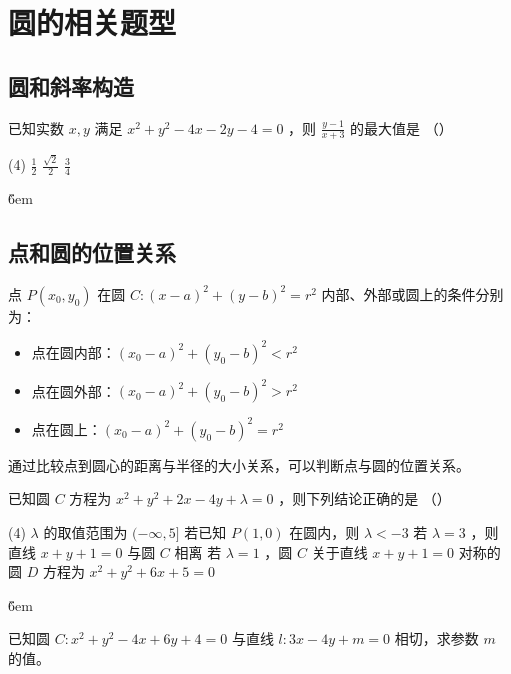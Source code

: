 \section{圆的相关题型}

\subsection{圆和斜率构造}

\begin{example}
    已知实数 $x, y$ 满足 $x^2+y^2-4 x-2 y-4=0$ ，则 $\frac{y-1}{x+3}$ 的最大值是 （\qquad）
    \begin{tasks}(4)
        \task $\frac{1}{2}$
        \task $\frac{\sqrt{2}}{2}$
        \task $\frac{3}{4}$
    \end{tasks}
\end{example}

\v{6em}

\subsection{点和圆的位置关系}

\begin{theorem}[点和圆的位置关系]
    点 $P(x_0, y_0)$ 在圆 $C:(x-a)^2+(y-b)^2=r^2$ 内部、外部或圆上的条件分别为：
    \begin{itemize}
        \item 点在圆内部：$(x_0-a)^2+(y_0-b)^2 < r^2$
        \item 点在圆外部：$(x_0-a)^2+(y_0-b)^2 > r^2$
        \item 点在圆上：$(x_0-a)^2+(y_0-b)^2 = r^2$
    \end{itemize}
    通过比较点到圆心的距离与半径的大小关系，可以判断点与圆的位置关系。
\end{theorem}

\begin{example}
    已知圆 $C$ 方程为 $x^2+y^2+2 x-4 y+\lambda=0$ ，则下列结论正确的是 （\qquad）
    \begin{tasks}(4)
        \task $\lambda$ 的取值范围为 $(-\infty, 5]$
        \task 若已知 $P(1,0)$ 在圆内，则 $\lambda<-3$
        \task 若 $\lambda=3$ ，则直线 $x+y+1=0$ 与圆 $C$ 相离
        \task 若 $\lambda=1$ ，圆 $C$ 关于直线 $x+y+1=0$ 对称的圆 $D$ 方程为 $x^2+y^2+6 x+5=0$
    \end{tasks}
\end{example}

\v{6em}

\begin{example}
    已知圆 $C: x^2+y^2-4x+6y+4=0$ 与直线 $l: 3x-4y+m=0$ 相切，求参数 $m$ 的值。
\end{example}

